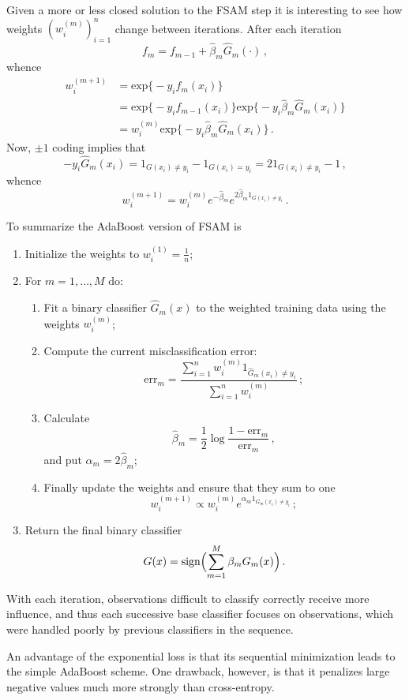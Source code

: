 \documentclass[a4paper]{article}
\begin{document}
Given a more or less closed solution to the FSAM step it is interesting to see
how weights $(w_i^{(m)})_{i=1}^n$ change between iterations. After each iteration
\[ f_m = f_{m-1} + \hat{\beta}_m \hat{G}_m(\cdot)\,, \]
whence
\begin{align*}
	w_i^{(m+1)}
	&= \text{exp}\bigl\{ -y_i f_m(x_i) \bigr\} \\
	&= \text{exp}\bigl\{ -y_i f_{m-1}(x_i) \bigr\}
	   \text{exp}\bigl\{ -y_i \hat{\beta}_m \hat{G}_m(x_i) \bigr\}\\
	&= w_i^{(m)}
	   \text{exp}\bigl\{ -y_i \hat{\beta}_m \hat{G}_m(x_i) \bigr\}\,.
\end{align*}
Now, $\pm1$ coding implies that
\[
- y_i \hat{G}_m(x_i)
= 1_{G(x_i) \neq y_i} - 1_{G(x_i) = y_i}
= 2 1_{G(x_i) \neq y_i} - 1\,,
\]
whence
\[ w_i^{(m+1)} = w_i^{(m)} e^{-\hat{\beta}_m} e^{ 2 \hat{\beta}_m 1_{G(x_i) \neq y_i}} \,. \]

To summarize the AdaBoost version of FSAM is
\begin{enumerate}
	\item Initialize the weights to $w_i^{(1)} = \frac{1}{n}$;
	\item For $m=1,\ldots, M$ do: \begin{enumerate}
		\item Fit a binary classifier $\hat{G}_m(x)$ to the weighted training data using
		the weights $w_i^{(m)}$;
		\item Compute the current misclassification error:
		\[
		\text{err}_m
			=\frac{ \sum_{i=1}^n w_i^{(m)} 1_{\hat{G}_m(x_i) \neq y_i}}{\sum_{i=1}^n w_i^{(m)}} \,;
		\]
		\item Calculate 
		\[ \hat{\beta}_m = \frac{1}{2} \log \frac{1-\text{err}_m}{\text{err}_m}\,, \]
		and put $\alpha_m = 2 \hat{\beta}_m$;
		\item Finally update the weights and ensure that they sum to one
		\[ w_i^{(m+1)} \propto w_i^{(m)} e^{ \alpha_m 1_{G_m(x_i)\neq y_i }} \,; \]
	\end{enumerate}
	\item Return the final binary classifier 
		\[ G(x) = \text{sign}\Bigl( \sum_{m=1}^M \beta_m G_m(x) \Bigr) \,. \]
\end{enumerate}

With each iteration, observations difficult to classify correctly receive more
influence, and thus each successive base classifier focuses on observations, which
were handled poorly by previous classifiers in the sequence.

An advantage of the exponential loss is that its sequential minimization leads to
the simple AdaBoost scheme. One drawback, however, is that it penalizes large negative
values much more strongly than cross-entropy.
\end{document}
